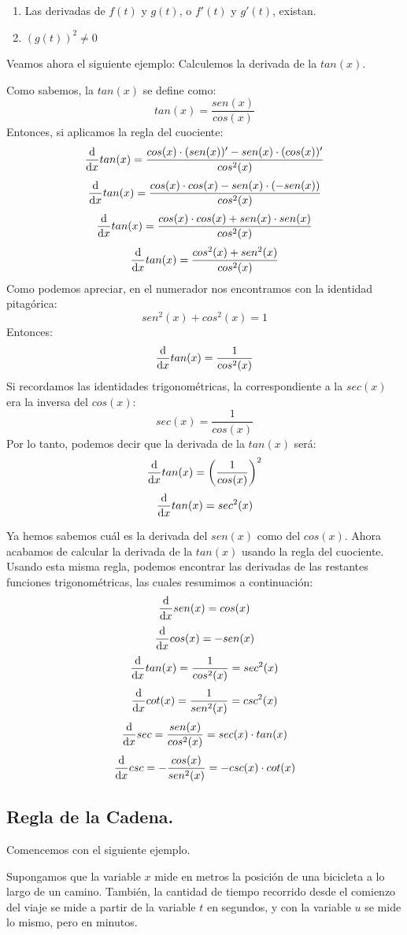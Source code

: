 \documentclass[12pt]{article}
\begin{document}
\begin{enumerate}
\item Las derivadas de $f(t)$ y $g(t)$, o $f'(t)$ y $g'(t)$, existan.
\item $(g(t))^{2} \neq 0$
\end{enumerate}

Veamos ahora el siguiente ejemplo: Calculemos la derivada de la $tan(x)$.

Como sabemos, la $tan(x)$ se define como:
\[tan(x) = \frac{sen(x)}{cos(x)}\]
Entonces, si aplicamos la regla del cuociente:
\[\diff*{tan(x)}x = \frac{cos(x) \cdot (sen(x))' - sen(x) \cdot (cos(x))'}{cos^{2}(x)}\]
\[\diff*{tan(x)}x = \frac{cos(x) \cdot cos(x) - sen(x) \cdot (-sen(x))}{cos^{2}(x)}\]
\[\diff*{tan(x)}x = \frac{cos(x) \cdot cos(x) + sen(x) \cdot sen(x)}{cos^{2}(x)}\]
\[\diff*{tan(x)}x = \frac{cos^{2}(x) + sen^{2}(x)}{cos^{2}(x)}\]
Como podemos apreciar, en el numerador nos encontramos con la identidad pitagórica:
\[sen^{2}(x) + cos^{2}(x) = 1\]
Entonces:
\[\diff*{tan(x)}x = \frac{1}{cos^{2}(x)}\]
Si recordamos las identidades trigonométricas, la correspondiente a la $sec(x)$ era la inversa del $cos(x)$:
\[sec(x) = \frac{1}{cos(x)}\]
Por lo tanto, podemos decir que la derivada de la $tan(x)$ será:
\[\diff*{tan(x)}x = \left(\frac{1}{cos(x)}\right)^{2}\]
\[\diff*{tan(x)}x = sec^{2}(x)\]

Ya hemos sabemos cuál es la derivada del $sen(x)$ como del $cos(x)$. Ahora acabamos de calcular la derivada de la $tan(x)$ usando la regla del cuociente. Usando esta misma regla, podemos encontrar las derivadas de las restantes funciones trigonométricas, las cuales resumimos a continuación:
\[\diff*{sen(x)}x = cos(x)\]
\[\diff*{cos(x)}x = -sen(x)\]
\[\diff*{tan(x)}x = \frac{1}{cos^{2}(x)} = sec^{2}(x)\]
\[\diff*{cot(x)}x = \frac{1}{sen^{2}(x)} = csc^{2}(x)\]
\[\diff*{sec}x = \frac{sen(x)}{cos^{2}(x)} = sec(x) \cdot tan(x)\]
\[\diff*{csc}x = - \frac{cos(x)}{sen^{2}(x)} = -csc(x) \cdot cot(x)\]




\subsection{Regla de la Cadena.}

Comencemos con el siguiente ejemplo.

Supongamos que la variable $x$ mide en metros la posición de una bicicleta a lo largo de un camino. También, la cantidad de tiempo recorrido desde el comienzo del viaje se mide a partir de la variable $t$ en segundos, y con la variable $u$ se mide lo mismo, pero en minutos.
\end{document}
